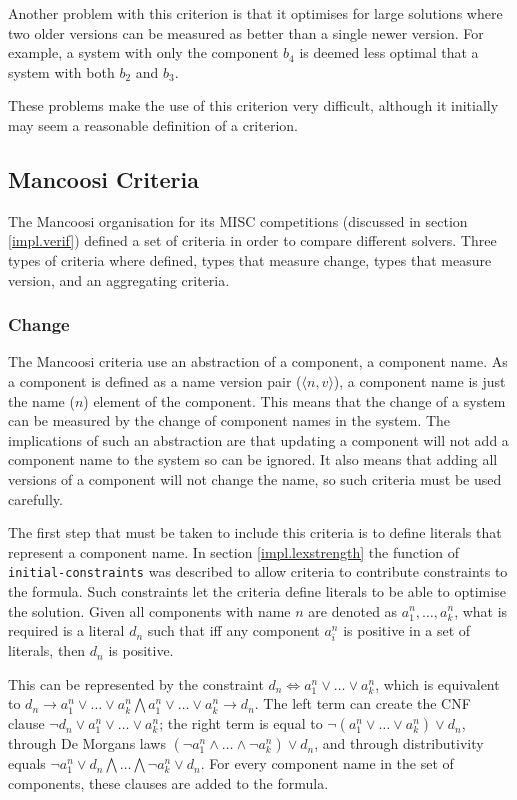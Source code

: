 Another problem with this criterion is that it optimises for large solutions where two older versions can be measured as better than a single newer version.
For example, a system with only the component $b_4$ is deemed less optimal that a system with both $b_2$ and $b_3$.

These problems make the use of this criterion very difficult, although it initially may seem a reasonable definition of a criterion.   


\subsection{Mancoosi Criteria}
The Mancoosi organisation for its MISC competitions (discussed in section \ref{impl.verif}) defined a set of criteria in order to compare different solvers.
Three types of criteria where defined, types that measure change, types that measure version, and an aggregating criteria. 

\subsubsection{Change}
The Mancoosi criteria use an abstraction of a component, a component name. 
As a component is defined as a name version pair ($\langle n,v \rangle$), a component name is just the name ($n$) element of the component. 
This means that the change of a system can be measured by the change of component names in the system.
The implications of such an abstraction are that updating a component will not add a component name to the system so can be ignored.
It also means that adding all versions of a component will not change the name, so such criteria must be used carefully.

The first step that must be taken to include this criteria is to define literals that represent a component name.
In section \ref{impl.lexstrength} the function of \verb+initial-constraints+ was described to allow criteria to contribute constraints to the formula.
Such constraints let the criteria define literals to be able to optimise the solution.
Given all components with name $n$ are denoted as $a^n_1,\ldots,a^n_k$,
what is required is a literal $d_n$ such that iff any component $a^n_i$ is positive in a set of literals, then $d_n$ is positive.

This can be represented by the constraint $d_n \Leftrightarrow a^n_1 \vee \ldots \vee a^n_k$, which
is equivalent to $d_n \rightarrow a^n_1 \vee \ldots \vee a^n_k \bigwedge a^n_1 \vee \ldots \vee a^n_k \rightarrow d_n$.
The left term can create the CNF clause $\neg d_n \vee a^n_1 \vee \ldots \vee a^n_k$;
the right term is equal to $\neg(a^n_1 \vee \ldots \vee a^n_k) \vee d_n$,
through De Morgans laws $(\neg a^n_1 \wedge \ldots \wedge \neg a^n_k) \vee d_n$,
and through distributivity equals $\neg a^n_1 \vee d_n \bigwedge \ldots \bigwedge \neg a^n_k \vee d_n$.      
For every component name in the set of components, these clauses are added to the formula.

